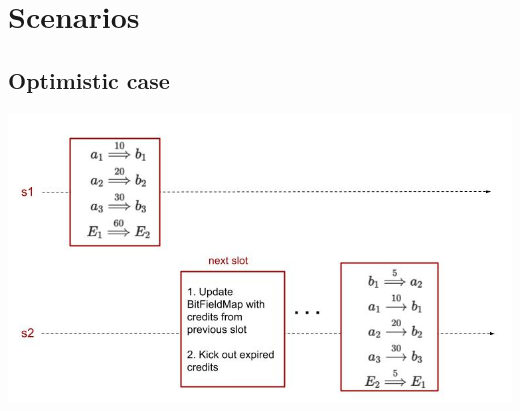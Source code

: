 \documentclass{article}
\begin{document}





\section{Scenarios}
\subsection{Optimistic case}
\includegraphics[scale=0.5]{OptmisiticCase.jpg}
\end{document}
